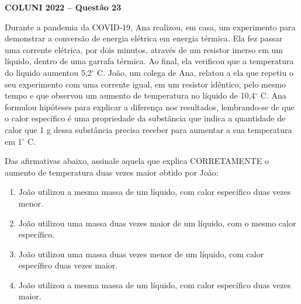 \textbf{COLUNI 2022 -- Questão 23}\par\medskip Durante a pandemia da COVID-19, Ana realizou, em casa, um experimento para demonstrar a conversão de energia elétrica em energia térmica. Ela fez passar uma corrente elétrica, por dois minutos, através de um resistor imerso em um líquido, dentro de uma garrafa térmica. Ao final, ela verificou que a temperatura do líquido aumentou 5,2$^\circ$ C. João, um colega de Ana, relatou a ela que repetiu o seu experimento com uma corrente igual, em um resistor idêntico, pelo mesmo tempo e que observou um aumento de temperatura no líquido de 10,4$^\circ$ C. Ana formulou hipóteses para explicar a diferença nos resultados, lembrando-se de que o calor específico é uma propriedade da substância que indica a quantidade de calor que 1 g dessa substância precisa receber para aumentar a sua temperatura em 1$^\circ$ C.

\par

Das afirmativas abaixo, assinale aquela que explica CORRETAMENTE o aumento de temperatura duas vezes maior obtido por João:\begin{enumerate}
\item João utilizou a mesma massa de um líquido, com calor específico duas vezes menor.
\item João utilizou uma massa duas vezes maior de um líquido, com o mesmo calor específico.
\item João utilizou uma massa duas vezes menor de um líquido, com calor específico duas vezes maior.
\item João utilizou a mesma massa de um líquido, com calor específico duas vezes maior.\end{enumerate}
